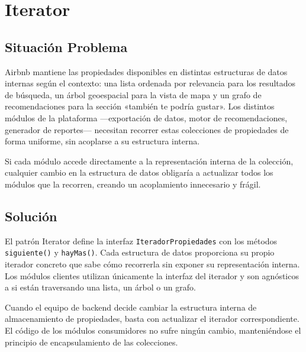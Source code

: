 
\chapter{Iterator}

\section{Situación Problema}

Airbnb mantiene las propiedades disponibles en distintas estructuras
de datos internas según el contexto: una lista ordenada por relevancia
para los resultados de búsqueda, un árbol geoespacial para la vista
de mapa y un grafo de recomendaciones para la sección «también te
podría gustar». Los distintos módulos de la plataforma —exportación de
datos, motor de recomendaciones, generador de reportes— necesitan
recorrer estas colecciones de propiedades de forma uniforme, sin acoplarse
a su estructura interna.

Si cada módulo accede directamente a la representación interna de la
colección, cualquier cambio en la estructura de datos obligaría a
actualizar todos los módulos que la recorren, creando un acoplamiento
innecesario y frágil.

\section{Solución}

El patrón Iterator define la interfaz \texttt{IteradorPropiedades} con
los métodos \texttt{siguiente()} y \texttt{hayMas()}. Cada estructura
de datos proporciona su propio iterador concreto que sabe cómo recorrerla
sin exponer su representación interna. Los módulos clientes utilizan
únicamente la interfaz del iterador y son agnósticos a si están
traversando una lista, un árbol o un grafo.

Cuando el equipo de backend decide cambiar la estructura interna de
almacenamiento de propiedades, basta con actualizar el iterador
correspondiente. El código de los módulos consumidores no sufre ningún
cambio, manteniéndose el principio de encapsulamiento de las colecciones.

